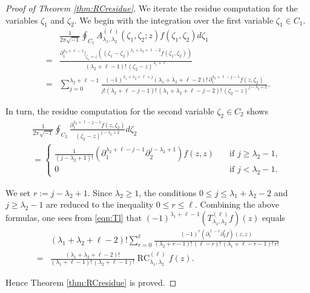 \documentclass[12pt]{amsart}
\newcommand{\RC}{\operatorname{RC}}
\theoremstyle{plain} %
\theoremstyle{definition} %
\theoremstyle{remark} %
\begin{document}
\begin{proof}
[Proof of Theorem \ref{thm:RCresidue}]
We iterate the residue computation for the variables $\zeta_1$ and $\zeta_2$.  
We begin with the integration
 over the first variable $\zeta_1 \in C_1$.  
\begin{align*}
  &\frac {1}{2 \pi \sqrt{-1}}
  \oint_{C_1} 
  A_{\lambda_1, \lambda_2}^{(\ell)}(\zeta_1, \zeta_2;z)f(\zeta_1, \zeta_2) d \zeta_1
\\
=& \frac{\partial_1^{\lambda_2+\ell-1}|_{\zeta_1=z}((\zeta_1-\zeta_2)^{\lambda_1+\lambda_2+\ell-2} f(\zeta_1, \zeta_2))}
  {(\lambda_2+\ell-1)!\, (\zeta_2-z)^{\lambda_1+\ell}}
\\
=& \sum_{j=0}^{\lambda_2+\ell-1}
   \frac{(-1)^{\lambda_1+\lambda_2+\ell+j} (\lambda_1+\lambda_2+\ell-2)!\, \partial_1^{\lambda_2+\ell-j-1}f(z, \zeta_2)}
        {j ! (\lambda_2 + \ell -j -1)!\, (\lambda_1+\lambda_2+\ell-j-2)!\, 
(\zeta_2-z)^{j-\lambda_2+2}}.  
\end{align*}



In turn, 
 the residue computation for the second variable $\zeta_2 \in C_2$ shows
\begin{multline*}
  \frac {1}{2 \pi \sqrt{-1}}
  \oint_{C_2} 
  \frac{\partial_1^{\lambda_2+\ell-j-1}f(z, \zeta_2)}
  {(\zeta_2-z)^{j-\lambda_2+2}}d \zeta_2
\\
=
  \begin{cases}
  \frac{1}{(j-\lambda_2+1)!}
  (\partial_1^{\lambda_2+\ell-j-1} \partial_2^{j-\lambda_2+1})f(z,z)
  \quad&\text{if $j \ge \lambda_2-1$, }
\\
  0\quad&\text{if $j < \lambda_2-1$}.  
\end{cases}
\end{multline*}



We set $r:=j-\lambda_2+1$.  
Since $\lambda_2 \ge 1$, 
 the conditions $0 \le j \le \lambda_1 + \lambda_2-2$
 and $j \ge \lambda_2-1$ are reduced to the inequality
 $0 \le r \le \ell$.  
Combining the above formulas, 
 one sees from \eqref{eqn:Tl}
 that $(-1)^{\lambda_1+\ell-1} (T_{\lambda_1,\lambda_2}^{(\ell)} f)(z)$ equals 
\begin{align*}
  &(\lambda_1+\lambda_2+\ell-2)!
   \sum_{r=0}^\ell
   \frac{(-1)^r  (\partial_1^{\ell-r} \partial_2^r f) (z,z)}
  {(\lambda_2+r-1)!\, (\ell-r)!\, (\lambda_1+\ell-r-1)!\, r!}
\\
  =&
  \frac{(\lambda_1+\lambda_2+\ell-2)!}
       {(\lambda_1+\ell-1)!\, (\lambda_2+\ell-1)!}
  \RC_{\lambda_1, \lambda_2}^{(\ell)}f(z).  
\end{align*}

Hence Theorem \ref{thm:RCresidue} is proved.  
\end{proof}
\end{document}
